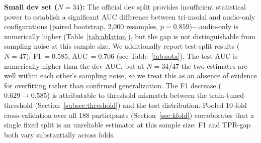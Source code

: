 \documentclass[5p,twocolumn]{elsarticle}
\begin{document}
\textbf{Small dev set ($N{=}34$):} The official dev split provides
insufficient statistical power to establish a significant AUC
difference between tri-modal and audio-only configurations
(paired bootstrap, 2,000 resamples, $p=0.859$)---audio-only is
numerically higher (Table~\ref{tab:ablation}), but the gap is not
distinguishable from sampling noise at this sample size. We
additionally report test-split results ($N{=}47$): F1\,$=0.585$,
AUC\,$=0.706$ (see Table~\ref{tab:sota}). The test AUC is numerically
higher than the dev AUC, but at $N{=}34$/$47$ the two estimates are
well within each other's sampling noise, so we treat this as an
absence of evidence for overfitting rather than confirmed
generalization. The F1 decrease
($0.629\to0.585$) is attributable to threshold mismatch between
the train-tuned threshold (Section~\ref{subsec:threshold}) and the
test distribution. Pooled 10-fold
cross-validation over all 188 participants
(Section~\ref{sec:kfold}) corroborates that a single fixed split is
an unreliable estimator at this sample size: F1 and TPR-gap both
vary substantially across folds.
\end{document}
